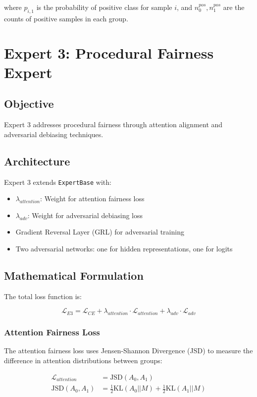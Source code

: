 \documentclass[11pt]{article}
\begin{document}
where $p_{i,1}$ is the probability of positive class for sample $i$, and $n_0^{pos}, n_1^{pos}$ are the counts of positive samples in each group.

\section{Expert 3: Procedural Fairness Expert}

\subsection{Objective}
Expert 3 addresses procedural fairness through attention alignment and adversarial debiasing techniques.

\subsection{Architecture}
Expert 3 extends \texttt{ExpertBase} with:
\begin{itemize}
    \item $\lambda_{attention}$: Weight for attention fairness loss
    \item $\lambda_{adv}$: Weight for adversarial debiasing loss
    \item Gradient Reversal Layer (GRL) for adversarial training
    \item Two adversarial networks: one for hidden representations, one for logits
\end{itemize}

\subsection{Mathematical Formulation}

The total loss function is:

\begin{equation}
    \mathcal{L}_{E3} = \mathcal{L}_{CE} + \lambda_{attention} \cdot \mathcal{L}_{attention} + \lambda_{adv} \cdot \mathcal{L}_{adv}
\end{equation}

\subsubsection{Attention Fairness Loss}
The attention fairness loss uses Jensen-Shannon Divergence (JSD) to measure the difference in attention distributions between groups:

\begin{align}
    \mathcal{L}_{attention} &= \text{JSD}(A_0, A_1) \\
    \text{JSD}(A_0, A_1) &= \frac{1}{2} \text{KL}(A_0 || M) + \frac{1}{2} \text{KL}(A_1 || M)
\end{align}
\end{document}

